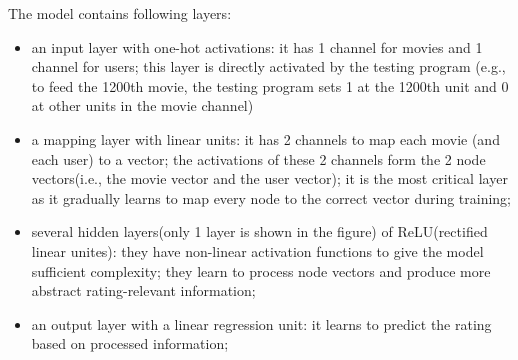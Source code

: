 \documentclass{article}
\begin{document}
The model contains following layers:
\begin{itemize}
	\item an input layer with one-hot activations: it has 1 channel for movies 
	and 1 channel for users;
	this layer is directly activated by the testing program (e.g., to feed the 
	1200th movie, the testing program sets 1 at the 1200th unit and 0 at other 	
	units in the movie channel)
	\item a mapping layer with linear units: it has 2 channels to map each 
	movie (and each user) to a vector;
	the activations of these 2 channels form the 2 node vectors(i.e., the movie 
	vector and the user vector);
	it is the most critical layer as it gradually learns to map every node to 
	the correct vector during training;
	\item several hidden layers(only 1 layer is shown in the figure) of 
	ReLU(rectified linear unites):
	they have non-linear activation functions to give the model sufficient 
	complexity; 
	they learn to process node vectors and produce more abstract 
	rating-relevant information;
	\item an output layer with a linear regression unit: it learns to predict 
	the rating based on processed information;
\end{itemize}
\end{document}
